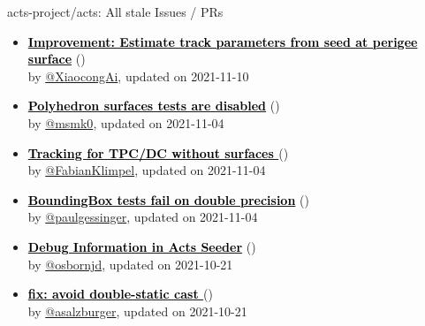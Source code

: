 \begin{frame}[allowframebreaks]{ acts-project/acts: All stale Issues / PRs}
\begin{itemize}
    \item\iss\prstale\textbf{\href{https://github.com/acts-project/acts/issues/1036}{\textcolor{black}{Improvement: Estimate track parameters from seed at perigee surface}}}
    (\href{https://github.com/acts-project/acts/issues/1036}{}) \\
    by \href{https://github.com/XiaocongAi}{@XiaocongAi}, updated on 2021-11-10

    \item\iss\prstale\textbf{\href{https://github.com/acts-project/acts/issues/454}{\textcolor{black}{Polyhedron surfaces tests are disabled}}}
    (\href{https://github.com/acts-project/acts/issues/454}{}) \\
    by \href{https://github.com/msmk0}{@msmk0}, updated on 2021-11-04

    \item\iss\prstale\textbf{\href{https://github.com/acts-project/acts/issues/165}{\textcolor{black}{Tracking for TPC/DC without surfaces }}}
    (\href{https://github.com/acts-project/acts/issues/165}{}) \\
    by \href{https://github.com/FabianKlimpel}{@FabianKlimpel}, updated on 2021-11-04

    \item\iss\prstale\textbf{\href{https://github.com/acts-project/acts/issues/752}{\textcolor{black}{BoundingBox tests fail on double precision}}}
    (\href{https://github.com/acts-project/acts/issues/752}{}) \\
    by \href{https://github.com/paulgessinger}{@paulgessinger}, updated on 2021-11-04

    \item\iss\prstale\textbf{\href{https://github.com/acts-project/acts/issues/944}{\textcolor{black}{Debug Information in Acts Seeder}}}
    (\href{https://github.com/acts-project/acts/issues/944}{}) \\
    by \href{https://github.com/osbornjd}{@osbornjd}, updated on 2021-10-21

    \item\iss\prstale\textbf{\href{https://github.com/acts-project/acts/issues/647}{\textcolor{black}{fix: avoid double-static cast }}}
    (\href{https://github.com/acts-project/acts/issues/647}{}) \\
    by \href{https://github.com/asalzburger}{@asalzburger}, updated on 2021-10-21

  \end{itemize}
\end{frame}
